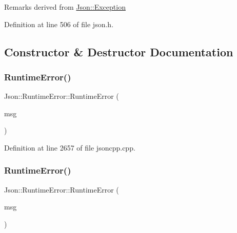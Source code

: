 \begin{DoxyRemark}{Remarks}
derived from \hyperlink{class_json_1_1_exception}{Json\+::\+Exception} 
\end{DoxyRemark}


Definition at line 506 of file json.\+h.



\subsection{Constructor \& Destructor Documentation}
\hypertarget{class_json_1_1_runtime_error_a0f6445dc345ce0a703610b6e893fee40}{}\label{class_json_1_1_runtime_error_a0f6445dc345ce0a703610b6e893fee40} 
\subsubsection{\texorpdfstring{Runtime\+Error()}{RuntimeError()}\hspace{0.1cm}{\footnotesize\ttfamily [1/2]}}
{\footnotesize\ttfamily Json\+::\+Runtime\+Error\+::\+Runtime\+Error (\begin{DoxyParamCaption}\item[{\hyperlink{config_8h_a1e723f95759de062585bc4a8fd3fa4be}{J\+S\+O\+N\+C\+P\+P\+\_\+\+S\+T\+R\+I\+NG} const \&}]{msg }\end{DoxyParamCaption})}



Definition at line 2657 of file jsoncpp.\+cpp.

\hypertarget{class_json_1_1_runtime_error_a0f6445dc345ce0a703610b6e893fee40}{}\label{class_json_1_1_runtime_error_a0f6445dc345ce0a703610b6e893fee40} 
\subsubsection{\texorpdfstring{Runtime\+Error()}{RuntimeError()}\hspace{0.1cm}{\footnotesize\ttfamily [2/2]}}
{\footnotesize\ttfamily Json\+::\+Runtime\+Error\+::\+Runtime\+Error (\begin{DoxyParamCaption}\item[{\hyperlink{config_8h_a1e723f95759de062585bc4a8fd3fa4be}{J\+S\+O\+N\+C\+P\+P\+\_\+\+S\+T\+R\+I\+NG} const \&}]{msg }\end{DoxyParamCaption})}



